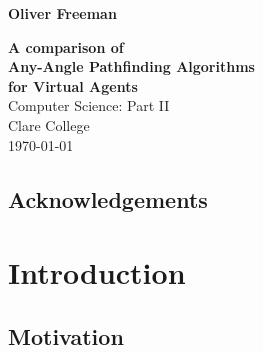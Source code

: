 \documentclass[12pt,notitlepage]{report}
\begin{document}


\pagestyle{empty}

\hfill{\LARGE \bf Oliver Freeman}

\vspace*{60mm}
\begin{center}
\Huge
{\bf A comparison of \\Any-Angle Pathfinding Algorithms \\for Virtual Agents} \\
\vspace*{5mm}
Computer Science: Part II \\
\vspace*{5mm}
Clare College \\
\vspace*{5mm}
\today  %
\end{center}

\cleardoublepage


\setcounter{page}{1}
\pagestyle{plain}



\cleardoublepage

\tableofcontents

\listoffigures

\listofalgorithms

\newpage
\section*{Acknowledgements}



\cleardoublepage        %

\setcounter{page}{1}
\pagestyle{headings}

\chapter{Introduction}

\section{Motivation}
\end{document}
